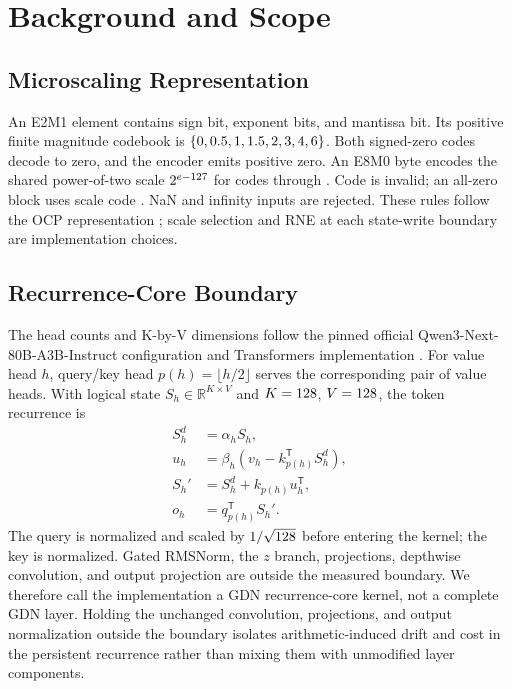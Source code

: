 \documentclass[conference]{IEEEtran}
\begin{document}
\section{Background and Scope}
\subsection{Microscaling Representation}
An E2M1 element contains \CorrectedETwoMOneSignBits{} sign bit,
\CorrectedETwoMOneExponentBits{} exponent bits, and
\CorrectedETwoMOneMantissaBits{} mantissa bit. Its positive finite magnitude
codebook is $\{0, 0.5, 1, 1.5, 2, 3, 4, 6\}$. Both signed-zero codes
decode to zero, and the encoder emits positive zero. An E8M0 byte encodes the
shared power-of-two scale $2^{e-127{}}$ for codes
\CorrectedEEightMZeroValidMinimum{} through
\CorrectedEEightMZeroValidMaximum{}. Code
\CorrectedEEightMZeroInvalidCode{} is invalid; an all-zero block uses scale code
\CorrectedEEightMZeroZeroBlockScale{}. NaN and infinity inputs are rejected.
These rules follow the OCP representation \cite{ocpmx}; scale selection and RNE
at each state-write boundary are implementation choices.

\subsection{Recurrence-Core Boundary}
The head counts and K-by-V dimensions follow the pinned official
Qwen3-Next-80B-A3B-Instruct configuration and Transformers implementation
\cite{qwen3nextmodel,transformersqwen}.
For value head $h$, query/key head $p(h)=\lfloor h/2\rfloor$ serves the
corresponding pair of value heads. With logical state
$S_h\in\mathbb{R}^{K\times V}$ and
$K=128$, $V=128$, the
token recurrence is
\begin{align}
S_h^{d} &= \alpha_h S_h, \\
u_h &= \beta_h\left(v_h-k_{p(h)}^\mathsf{T}S_h^{d}\right), \\
S_h' &= S_h^{d}+k_{p(h)}u_h^\mathsf{T}, \\
o_h &= q_{p(h)}^\mathsf{T}S_h'.
\end{align}
The query is normalized and scaled by $1/\sqrt{128}$ before entering the
kernel; the key is normalized. Gated RMSNorm, the $z$ branch, projections,
depthwise convolution, and output projection are outside the measured
boundary. We therefore call the implementation a GDN recurrence-core kernel,
not a complete GDN layer.
Holding the unchanged convolution, projections, and output normalization outside
the boundary isolates arithmetic-induced drift and cost in the persistent
recurrence rather than mixing them with unmodified layer components.
\end{document}
